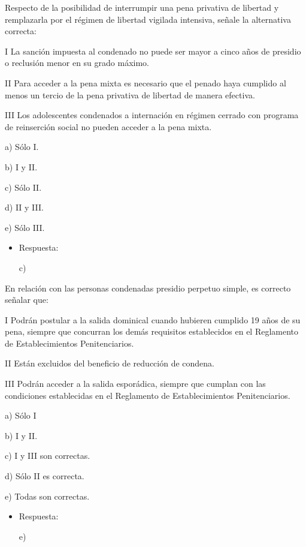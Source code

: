 \documentclass[letterpaper, 11pt]{article}
\begin{document}
Respecto de la posibilidad de interrumpir una pena privativa de
libertad y remplazarla por el régimen de libertad vigilada intensiva,
señale la alternativa correcta:


I La sanción impuesta al condenado no puede ser mayor a cinco años de
presidio o reclusión menor en su grado máximo.

II Para acceder a la pena mixta es necesario que el penado haya
cumplido al menos un tercio de la pena privativa de libertad de manera
efectiva.

III Los adolescentes condenados a internación en régimen cerrado con
programa de reinserción social no pueden acceder a la pena mixta.


a) Sólo I.


b) I y II.



c) Sólo II.


d) II y III.



e) Sólo III.


\begin{itemize}
\item Respuesta:

c)
\end{itemize}



En relación con las personas condenadas presidio perpetuo simple, es
correcto señalar que:


I Podrán postular a la salida dominical cuando hubieren cumplido 19
años de su pena, siempre que concurran los demás requisitos
establecidos en el Reglamento de Establecimientos Penitenciarios.

II Están excluidos del beneficio de reducción de condena.

III Podrán acceder a la salida esporádica, siempre que cumplan con las
condiciones establecidas en el Reglamento de Establecimientos
Penitenciarios.


a) Sólo I

b) I y II.


c) I y III son correctas.



d) Sólo II es correcta.


e) Todas son correctas.


\begin{itemize}
\item Respuesta:

e)
\end{itemize}
\end{document}
